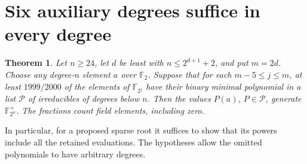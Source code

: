 \documentclass[11pt]{article}
\newtheorem{theorem}{Theorem}
\newcommand{\F}{\mathbb F_2}
\begin{document}
\section{Six auxiliary degrees suffice in every degree}
\label{sec:signed-six-fields}
\begin{theorem}
Let \(n\ge24\), let \(d\) be least with \(n\le2^{d+1}+2\),
and put \(m=2d\). Choose any degree-\(n\) element \(a\) over \(\F\).
Suppose that for each \(m-5\le j\le m\), at least
\(1999/2000\) of the elements of \(\mathbb F_{2^j}\) have their binary
minimal polynomial in a list \(\mathcal P\) of irreducibles of degrees below \(n\).
Then the values \(P(a)\), \(P\in\mathcal P\), generate
\(\mathbb F_{2^n}^\times\). The fractions count field elements, including zero.
\end{theorem}
In particular, for a proposed sparse root it suffices to show that
its powers include all the retained evaluations. The hypotheses allow
the omitted polynomials to have arbitrary degrees.
\end{document}

